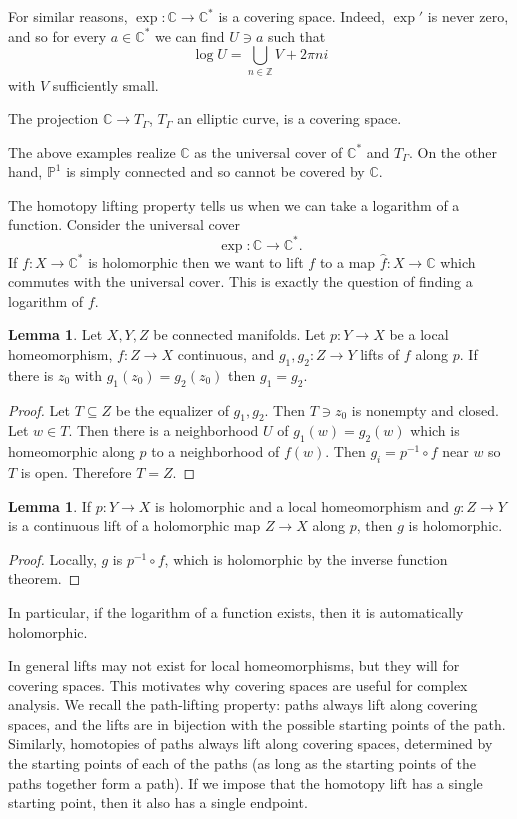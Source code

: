 \documentclass[12pt]{book}
\newcommand{\ZZ}{\mathbb{Z}}
\newcommand{\CC}{\mathbb{C}}
\newcommand{\PP}{\mathbb{P}}
\theoremstyle{definition}
\newtheorem{lemma}[theorem]{Lemma}
\newenvironment{example}
  {\pushQED{\qed}\renewcommand{\qedsymbol}{$\diamondsuit$}\examplex}
  {\popQED\endexamplex}
\begin{document}
\begin{example}
For similar reasons, $\exp: \CC \to \CC^*$ is a covering space.
Indeed, $\exp'$ is never zero, and so for every $a \in \CC^*$ we can find $U \ni a$ such that
$$\log U = \bigcup_{n \in \ZZ} V + 2\pi ni$$
with $V$ sufficiently small.
\end{example}

\begin{example}
The projection $\CC \to T_\Gamma$, $T_\Gamma$ an elliptic curve, is a covering space.
\end{example}

The above examples realize $\CC$ as the universal cover of $\CC^*$ and $T_\Gamma$.
On the other hand, $\PP^1$ is simply connected and so cannot be covered by $\CC$.

The homotopy lifting property tells us when we can take a logarithm of a function. Consider the universal cover
$$\exp: \CC \to \CC^*.$$
If $f: X \to \CC^*$ is holomorphic then we want to lift $f$ to a map $\hat f: X \to \CC$ which commutes with the universal cover.
This is exactly the question of finding a logarithm of $f$.

\begin{lemma}
Let $X,Y,Z$ be connected manifolds.
Let $p: Y \to X$ be a local homeomorphism, $f: Z \to X$ continuous, and $g_1, g_2: Z \to Y$ lifts of $f$ along $p$.
If there is $z_0$ with $g_1(z_0) = g_2(z_0)$ then $g_1 = g_2$.
\end{lemma}
\begin{proof}
Let $T \subseteq Z$ be the equalizer of $g_1,g_2$. Then $T \ni z_0$ is nonempty and closed.
Let $w \in T$. Then there is a neighborhood $U$ of $g_1(w) = g_2(w)$ which is homeomorphic along $p$ to a neighborhood of $f(w)$.
Then $g_i = p^{-1}\circ f$ near $w$ so $T$ is open.
Therefore $T = Z$.
\end{proof}

\begin{lemma}
If $p: Y \to X$ is holomorphic and a local homeomorphism and $g: Z \to Y$ is a continuous lift of a holomorphic map $Z \to X$ along $p$, then $g$ is holomorphic.
\end{lemma}
\begin{proof}
Locally, $g$ is $p^{-1} \circ f$, which is holomorphic by the inverse function theorem.
\end{proof}

In particular, if the logarithm of a function exists, then it is automatically holomorphic.

In general lifts may not exist for local homeomorphisms, but they will for covering spaces.
This motivates why covering spaces are useful for complex analysis.
We recall the path-lifting property: paths always lift along covering spaces, and the lifts are in bijection with the possible starting points of the path.
Similarly, homotopies of paths always lift along covering spaces, determined by the starting points of each of the paths (as long as the starting points of the paths together form a path).
If we impose that the homotopy lift has a single starting point, then it also has a single endpoint.
\end{document}
